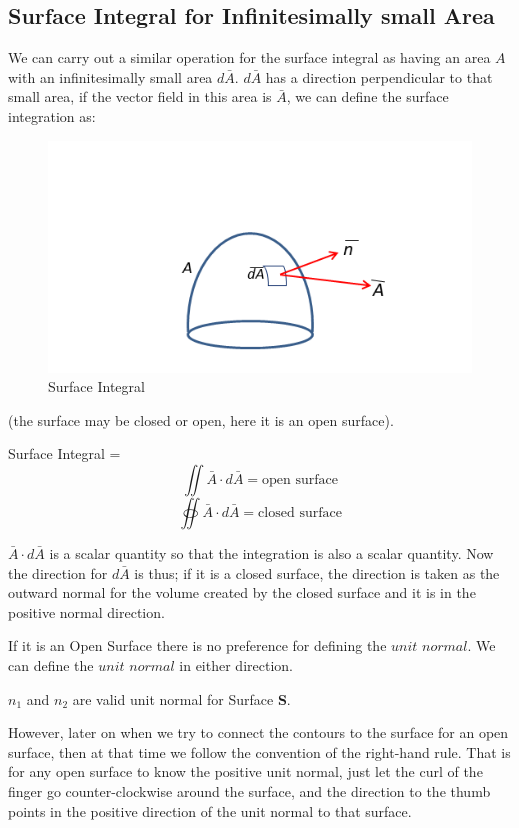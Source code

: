 \subsection{Surface Integral for Infinitesimally small Area}
We can carry out a similar operation for the surface integral as having an area $A$ with an infinitesimally small area $d\bar{A}$. $d\bar{A}$ has a direction perpendicular to that small area, if the vector field in this area is $\bar{A}$, we can define the surface integration as:
\begin{figure}
\centering
\includegraphics[width=1\linewidth]{graphics/surface_Int}
\caption{Surface Integral}
\end{figure}
(the surface may be closed or open, here it is an open surface).

Surface Integral =
\begin{equation*}
\iint \bar{A} \cdot d\bar{A}= \text{open surface}
\end{equation*}
\begin{equation}
\oiint \bar{A} \cdot d\bar{A} = \text{closed surface}
\end{equation}

$\bar{A} \cdot d\bar{A}$ is a scalar quantity so that the integration is also a scalar quantity. Now the direction for $d\bar{A}$ is thus; if it is a closed surface, the direction is taken as the outward normal for the volume created by the closed surface and it is in the positive normal direction.

If it is an Open Surface there is no preference for defining the $unit$ $normal$. We can define the $unit$ $normal$ in either direction.

$n_1$ and $n_2$ are valid unit normal for Surface \textbf{S}.

However, later on when we try to connect the contours to the surface for an open surface, then at that time we follow the convention of the right-hand rule. That is for any open surface to know the positive unit normal, just let the curl of the finger go counter-clockwise around the surface, and the direction to the thumb points in the positive direction of the unit normal to that surface.

